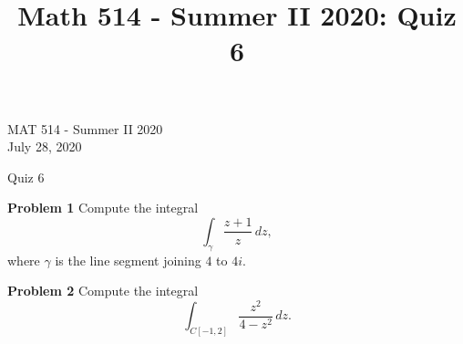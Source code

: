 \documentclass[12pt,oneside]{exam}
\title{Math 514 - Summer II 2020: Quiz 6}
\newenvironment{exercise}[1]{\vspace{.1in}\noindent\textbf{Problem #1 \hspace{.05em}}}{}
\begin{document}
\begin{flushright}
\sc MAT 514 - Summer II 2020\\
July 28, 2020
\end{flushright}
\bigskip
 
\begin{center}
\textsf{Quiz 6} 
\end{center}


\begin{exercise}{1}
Compute the integral
\begin{equation*}
\int_{\gamma} \frac{z+1}{z}	\, dz,
\end{equation*}
where $\gamma$ is the line segment joining $4$ to $4i$.
\end{exercise}

\vfill
\begin{exercise}{2}
Compute the integral 
\begin{equation*}
\int_{C[-1,2]} \frac{z^2}{4-z^2} \, dz.
\end{equation*}
\end{exercise}

\vfill
\end{document}
